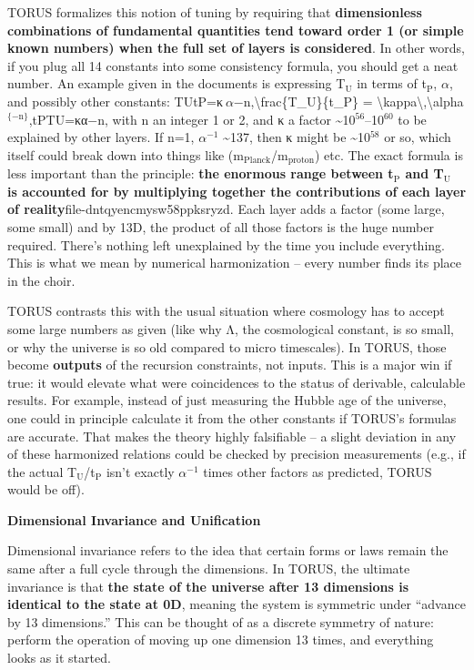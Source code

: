 \documentclass[]{article}
\newcommand{\subscript}[1]{\ensuremath{_{\mathrm{#1}}}}
\newcommand{\superscript}[1]{\ensuremath{^{\mathrm{#1}}}}
\begin{document}
TORUS formalizes this notion of tuning by requiring that
\textbf{dimensionless combinations of fundamental quantities tend toward
order 1 (or simple known numbers) when the full set of layers is
considered}​. In other words, if you plug all 14 constants into some
consistency formula, you should get a neat number. An example given in
the documents is expressing
T\subscript{U} in terms of
t\subscript{P}, $\alpha$, and
possibly other constants:
TUtP=κ $\alpha$−n,\textbackslash{}frac\{T\_U\}\{t\_P\} =
\textbackslash{}kappa\textbackslash{},\textbackslash{}alpha\superscript{\{-n\}},tP​TU​​=κα−n,
with n an integer 1 or 2, and κ a factor
\textasciitilde{}10\superscript{56}--10\superscript{60} to be explained by other layers​. If
n=1, $\alpha\superscript{−1}$ \textasciitilde{}137, then κ might be
\textasciitilde{}10\superscript{58} or so, which itself could break down into
things like
(m\subscript{Planck}/m\subscript{proton})
etc. The exact formula is less important than the principle: \textbf{the
enormous range between
t\subscript{P} and
T\subscript{U} is accounted
for by multiplying together the contributions of each layer of
reality}​file-dntqyencmysw58ppksryzd. Each layer adds a factor (some
large, some small) and by 13D, the product of all those factors is the
huge number required. There's nothing left unexplained by the time you
include everything. This is what we mean by numerical harmonization --
every number finds its place in the choir.

TORUS contrasts this with the usual situation where cosmology has to
accept some large numbers as given (like why Λ, the cosmological
constant, is so small, or why the universe is so old compared to micro
timescales). In TORUS, those become \textbf{outputs} of the recursion
constraints, not inputs​. This is a major win if true: it would elevate
what were coincidences to the status of derivable, calculable results​.
For example, instead of just measuring the Hubble age of the universe,
one could in principle calculate it from the other constants if TORUS's
formulas are accurate. That makes the theory highly falsifiable -- a
slight deviation in any of these harmonized relations could be checked
by precision measurements (e.g., if the actual
T\subscript{U}/t\subscript{P}
isn't exactly $\alpha\superscript{−1}$ times other factors as predicted, TORUS would be
off).

\textbf{Dimensional Invariance and Unification}

Dimensional invariance refers to the idea that certain forms or laws
remain the same after a full cycle through the dimensions. In TORUS, the
ultimate invariance is that \textbf{the state of the universe after 13
dimensions is identical to the state at 0D}, meaning the system is
symmetric under ``advance by 13 dimensions.'' This can be thought of as
a discrete symmetry of nature: perform the operation of moving up one
dimension 13 times, and everything looks as it started​.
\end{document}
